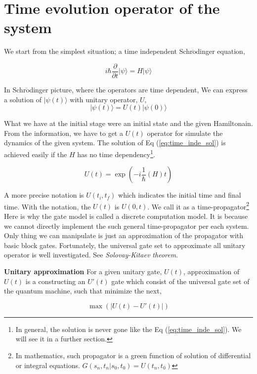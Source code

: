 \section{Time evolution operator of the system}

We start from the simplest situation; a time independent Schr$\ddot{\mbox{o}}$dinger equation,

\begin{equation*}
    i \hbar \frac{\partial }{\partial t} | \psi \rangle = H | \psi \rangle
\end{equation*}

In Schr$\ddot{\mbox{o}}$dinger picture, where the operators are time dependent,
We can express a solution of $|\psi(t) \rangle$ with unitary operator, $U$,
\begin{equation}
    \label{eq:time_inde_sol}
    |\psi(t)\rangle = U(t) | \psi(0)\rangle 
\end{equation}

What we have at the initial stage were an initial state and the given Hamiltonain.
From the information, we have to get a $U(t)$ operator for simulate
the dynamics of the given system.
The solution of Eq (\ref{eq:time_inde_sol}) is achieved easily 
if the $H$ has no time dependency\footnote{
    In general, the solution is never gone like the Eq (\ref{eq:time_inde_sol}). 
    We will see it in a further section.}.

\begin{equation}
    U(t) = \exp( -i \frac{1}{\hbar} (H) t)
\end{equation}

A more precise notation is $U(t_i, t_f)$ which indicates the initial time and final time.
With the notation, the $U(t)$ is $U(0, t)$.
We call it as a time-propagator\footnote{
    In mathematics, such propagator is a green function of solution of differential or integral equations.
    $G(s_n, t_n | s_0, t_0) = U(t_n, t_0)$
}
Here is why the gate model is called a discrete computation model.
It is because we cannot directly implement the such general time-propagator 
per each system. Only thing we can manipulate is just an approximation 
of the propagator with basic block gates. 
Fortunately, the universal gate set to approximate all unitary operator
is well investigated. See \textit{Solovay-Kitaev theorem}.


\begin{definition}\textbf{Unitary approximation}
    For a given unitary gate, $U(t)$, 
    approximation of $U(t)$ is a constructing an $U'(t)$ gate 
    which consist of the universal gate set of the quantum machine,
    such that minimize the next,

    \begin{equation}
        \max\left(|U(t) - U'(t)|\right)
    \end{equation}
\end{definition}

